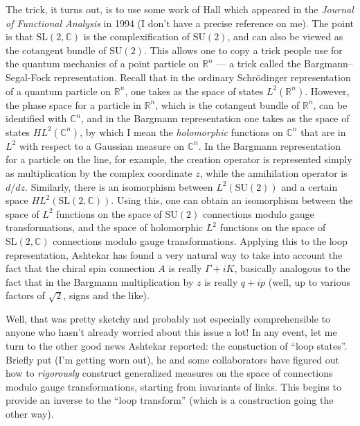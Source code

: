 \documentclass{article}
\begin{document}
The trick, it turns out, is to use some work of Hall which appeared in
the \emph{Journal of Functional Analysis} in 1994 (I don't have a precise
reference on me). The point is that \(\mathrm{SL}(2,\mathbb{C})\) is the
complexification of \(\mathrm{SU}(2)\), and can also be viewed as the
cotangent bundle of \(\mathrm{SU}(2)\). This allows one to copy a trick
people use for the quantum mechanics of a point particle on
\(\mathbb{R}^n\) --- a trick called the Bargmann--Segal-Fock
representation. Recall that in the ordinary Schr\"odinger representation
of a quantum particle on \(\mathbb{R}^n\), one takes as the space of
states \(L^2(\mathbb{R}^n)\). However, the phase space for a particle in
\(\mathbb{R}^n\), which is the cotangent bundle of \(\mathbb{R}^n\), can
be identified with \(\mathbb{C}^n\), and in the Bargmann representation
one takes as the space of states \(HL^2(\mathbb{C}^n)\), by which I mean
the \emph{holomorphic} functions on \(\mathbb{C}^n\) that are in \(L^2\)
with respect to a Gaussian measure on \(\mathbb{C}^n\). In the Bargmann
representation for a particle on the line, for example, the creation
operator is represented simply as multiplication by the complex
coordinate \(z\), while the annihilation operator is \(d/dz\).
Similarly, there is an isomorphism between \(L^2(\mathrm{SU}(2))\) and a
certain space \(HL^2(\mathrm{SL}(2,\mathbb{C}))\). Using this, one can
obtain an isomorphism between the space of \(L^2\) functions on the
space of \(\mathrm{SU}(2)\) connections modulo gauge transformations,
and the space of holomorphic \(L^2\) functions on the space of
\(\mathrm{SL}(2,\mathbb{C})\) connections modulo gauge transformations.
Applying this to the loop representation, Ashtekar has found a very
natural way to take into account the fact that the chiral spin
connection \(A\) is really \(\Gamma + iK\), basically analogous to the
fact that in the Bargmann multiplication by \(z\) is really \(q + ip\)
(well, up to various factors of \(\sqrt{2}\), signs and the like).

Well, that was pretty sketchy and probably not especially comprehensible
to anyone who hasn't already worried about this issue a lot! In any
event, let me turn to the other good news Ashtekar reported: the
constuction of ``loop states''. Briefly put (I'm getting worn out), he
and some collaborators have figured out how to \emph{rigorously}
construct generalized measures on the space of connections modulo gauge
transformations, starting from invariants of links. This begins to
provide an inverse to the ``loop transform'' (which is a construction
going the other way).
\end{document}
